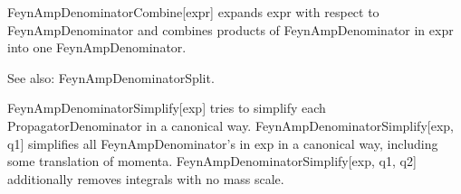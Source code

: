 










FeynAmpDenominatorCombine[expr] expands expr with respect to FeynAmpDenominator and combines products of FeynAmpDenominator in expr into
  one FeynAmpDenominator.

See also:  FeynAmpDenominatorSplit.










FeynAmpDenominatorSimplify[exp] tries to simplify each PropagatorDenominator in a canonical way. FeynAmpDenominatorSimplify[exp, q1]
  simplifies all FeynAmpDenominator's in exp in a canonical way, including some translation of momenta. FeynAmpDenominatorSimplify[exp,
  q1, q2] additionally removes integrals with no mass scale.

